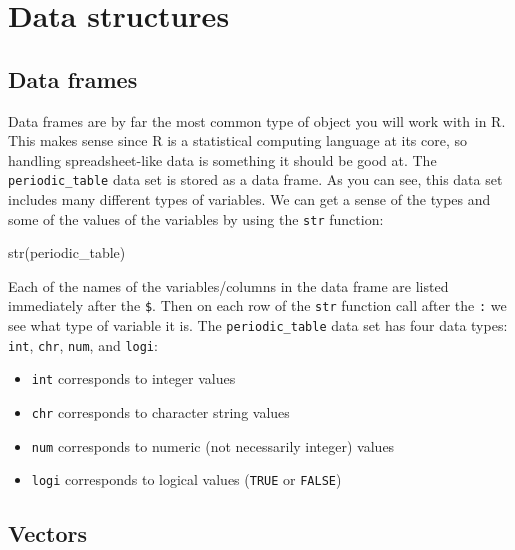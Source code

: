 \documentclass[]{tufte-book}
\newenvironment{Shaded}{\begin{snugshade}}{\end{snugshade}}
\newcommand{\FunctionTok}[1]{\textcolor[rgb]{0.00,0.00,0.00}{#1}}
\newcommand{\NormalTok}[1]{#1}
\providecommand{\tightlist}{%
  \setlength{\itemsep}{0pt}\setlength{\parskip}{0pt}}
\begin{document}
\hypertarget{data-structures}{%
\section{Data structures}\label{data-structures}}

\hypertarget{data-frames}{%
\subsection{Data frames}\label{data-frames}}

Data frames are by far the most common type of object you will work with in R. This makes sense since R is a statistical computing language at its core, so handling spreadsheet-like data is something it should be good at. The \texttt{periodic\_table} data set is stored as a data frame. As you can see, this data set includes many different types of variables. We can get a sense of the types and some of the values of the variables by using the \texttt{str} function:

\begin{Shaded}
\begin{Highlighting}[]
\FunctionTok{str}\NormalTok{(periodic\_table)}
\end{Highlighting}
\end{Shaded}

Each of the names of the variables/columns in the data frame are listed immediately after the \texttt{\$}. Then on each row of the \texttt{str} function call after the \texttt{:} we see what type of variable it is. The \texttt{periodic\_table} data set has four data types: \texttt{int}, \texttt{chr}, \texttt{num}, and \texttt{logi}:

\begin{itemize}
\tightlist
\item
  \texttt{int} corresponds to integer values
\item
  \texttt{chr} corresponds to character string values
\item
  \texttt{num} corresponds to numeric (not necessarily integer) values
\item
  \texttt{logi} corresponds to logical values (\texttt{TRUE} or \texttt{FALSE})
\end{itemize}

\hypertarget{vectors}{%
\subsection{Vectors}\label{vectors}}
\end{document}
